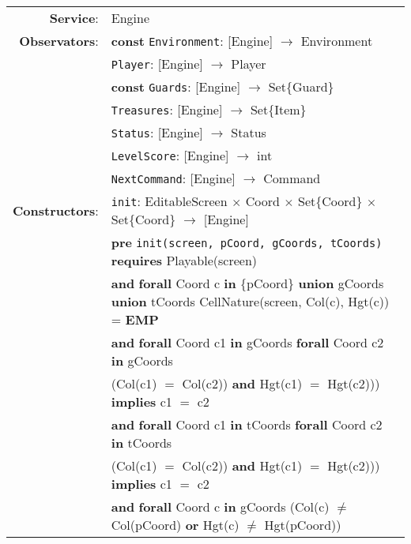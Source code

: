 \documentclass[8pt]{article}
\begin{document}
{\small
\begin{longtable}{rl}
  \textbf{Service}: & \textrm{Engine}  \\
  \textbf{Observators}: & \textbf{const} \texttt{Environment}: \textrm{[Engine]} $\rightarrow$ \textrm{Environment} \\
  & \texttt{Player}: \textrm{[Engine]} $\rightarrow$ \textrm{Player} \\
  & \textbf{const} \texttt{Guards}: \textrm{[Engine]} $\rightarrow$ \textrm{Set\{Guard\}} \\
  & \texttt{Treasures}: \textrm{[Engine]} $\rightarrow$ \textrm{Set\{Item\}} \\
  & \texttt{Status}: \textrm{[Engine]} $\rightarrow$ \textrm{Status} \\
  & \texttt{LevelScore}: \textrm{[Engine]} $\rightarrow$ \textrm{int} \\
  & \texttt{NextCommand}: \textrm{[Engine]} $\rightarrow$ \textrm{Command} \\
  \textbf{Constructors}: &\texttt{init}: \textrm{EditableScreen} $\times$ \textrm{Coord} $\times$ \textrm{Set\{Coord\}} $\times$ \textrm{Set\{Coord\}} $\rightarrow$ \textrm{[Engine]} \\
  & \quad \textbf{pre} \texttt{init(screen, pCoord, gCoords, tCoords)} \textbf{requires} \textrm{Playable(screen)}\\
  & \quad\quad\quad \textbf{and} \textbf{forall} \textrm{Coord} c \textbf{in} \{pCoord\} \textbf{union} gCoords \textbf{union} tCoords \textrm{CellNature(screen, Col(c), Hgt(c))} = \textbf{EMP} \\
  & \quad\quad\quad \textbf{and} \textbf{forall} \textrm{Coord} c1 \textbf{in} gCoords \textbf{forall} \textrm{Coord} c2 \textbf{in} gCoords \\
  & \quad\quad\quad\quad\quad (\textrm{Col(c1)} $=$ \textrm{Col(c2))} \textbf{and} \textrm{Hgt(c1)} $=$ \textrm{Hgt(c2))}) \textbf{implies} c1 $=$ c2\\
  & \quad\quad\quad \textbf{and} \textbf{forall} \textrm{Coord} c1 \textbf{in} tCoords \textbf{forall} \textrm{Coord} c2 \textbf{in} tCoords \\
  & \quad\quad\quad\quad\quad (\textrm{Col(c1)} $=$ \textrm{Col(c2))} \textbf{and} \textrm{Hgt(c1)} $=$ \textrm{Hgt(c2))}) \textbf{implies} c1 $=$ c2\\
  & \quad\quad\quad \textbf{and} \textbf{forall} \textrm{Coord} c \textbf{in} gCoords (\textrm{Col(c)} $\neq$ \textrm{Col(pCoord)} \textbf{or} \textrm{Hgt(c)} $\neq$ \textrm{Hgt(pCoord)})\\

\end{longtable}}
\end{document}
